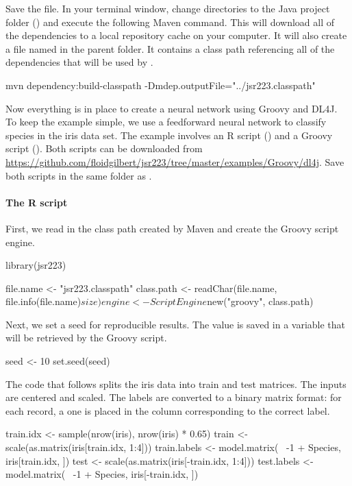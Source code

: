 Save the  file. In your terminal window, change directories to the Java project folder () and execute the following Maven command. This will download all of the dependencies to a local repository cache on your computer. It will also create a file named  in the parent folder. It contains a class path referencing all of the dependencies that will be used by .

\begin{example}
mvn dependency:build-classpath -Dmdep.outputFile="../jsr223.classpath"
\end{example}

Now everything is in place to create a neural network using Groovy and DL4J. To keep the example simple, we use a feedforward neural network to classify species in the iris data set. The example involves an R script () and a Groovy script (). Both scripts can be downloaded from \url{https://github.com/floidgilbert/jsr223/tree/master/examples/Groovy/dl4j}. Save both scripts in the same folder as .

\paragraph{The R script} First, we read in the class path created by Maven and create the Groovy script engine.

\begin{example}
library(jsr223)

file.name <- "jsr223.classpath"
class.path <- readChar(file.name, file.info(file.name)$size)
engine <- ScriptEngine$new("groovy", class.path)
\end{example}

Next, we set a seed for reproducible results. The value is saved in a variable that will be retrieved by the Groovy script.

\begin{example}
seed <- 10
set.seed(seed)
\end{example}

The code that follows splits the iris data into train and test matrices. The inputs are centered and scaled. The labels are converted to a binary matrix format: for each record, a one is placed in the column corresponding to the correct label.

\begin{example}
train.idx <- sample(nrow(iris), nrow(iris) * 0.65)
train <- scale(as.matrix(iris[train.idx, 1:4]))
train.labels <- model.matrix(~ -1 + Species, iris[train.idx, ])
test <- scale(as.matrix(iris[-train.idx, 1:4]))
test.labels <- model.matrix(~ -1 + Species, iris[-train.idx, ])
\end{example}

